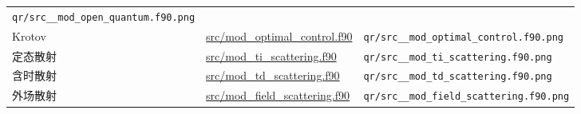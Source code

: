 \documentclass[
]{ctexbook}
\begin{document}
\begin{longtable}[]{@{}lll@{}}
\begin{minipage}[t]{0.30\columnwidth}
\texttt{qr/src\_\_mod\_open\_quantum.f90.png}\strut
\end{minipage}\tabularnewline
\begin{minipage}[t]{0.30\columnwidth}\raggedright
Krotov\strut
\end{minipage} & \begin{minipage}[t]{0.30\columnwidth}\raggedright
\href{https://github.com/l1Ha/QuantumGeneralModule/blob/main/src/mod_optimal_control.f90}{src/mod\_optimal\_control.f90}\strut
\end{minipage} & \begin{minipage}[t]{0.30\columnwidth}\raggedright
\texttt{qr/src\_\_mod\_optimal\_control.f90.png}\strut
\end{minipage}\tabularnewline
\begin{minipage}[t]{0.30\columnwidth}\raggedright
定态散射\strut
\end{minipage} & \begin{minipage}[t]{0.30\columnwidth}\raggedright
\href{https://github.com/l1Ha/QuantumGeneralModule/blob/main/src/mod_ti_scattering.f90}{src/mod\_ti\_scattering.f90}\strut
\end{minipage} & \begin{minipage}[t]{0.30\columnwidth}\raggedright
\texttt{qr/src\_\_mod\_ti\_scattering.f90.png}\strut
\end{minipage}\tabularnewline
\begin{minipage}[t]{0.30\columnwidth}\raggedright
含时散射\strut
\end{minipage} & \begin{minipage}[t]{0.30\columnwidth}\raggedright
\href{https://github.com/l1Ha/QuantumGeneralModule/blob/main/src/mod_td_scattering.f90}{src/mod\_td\_scattering.f90}\strut
\end{minipage} & \begin{minipage}[t]{0.30\columnwidth}\raggedright
\texttt{qr/src\_\_mod\_td\_scattering.f90.png}\strut
\end{minipage}\tabularnewline
\begin{minipage}[t]{0.30\columnwidth}\raggedright
外场散射\strut
\end{minipage} & \begin{minipage}[t]{0.30\columnwidth}\raggedright
\href{https://github.com/l1Ha/QuantumGeneralModule/blob/main/src/mod_field_scattering.f90}{src/mod\_field\_scattering.f90}\strut
\end{minipage} & \begin{minipage}[t]{0.30\columnwidth}\raggedright
\texttt{qr/src\_\_mod\_field\_scattering.f90.png}\strut

\end{minipage}
\end{longtable}
\end{document}
